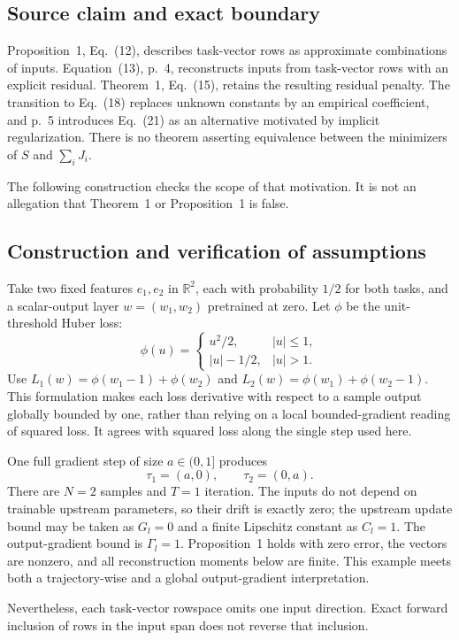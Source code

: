 \documentclass[10pt]{article}
\begin{document}
\subsection*{Source claim and exact boundary}
Proposition 1, Eq. (12), describes task-vector rows as approximate combinations of inputs. Equation (13), p. 4, reconstructs inputs from task-vector rows with an explicit residual. Theorem 1, Eq. (15), retains the resulting residual penalty. The transition to Eq. (18) replaces unknown constants by an empirical coefficient, and p. 5 introduces Eq. (21) as an alternative motivated by implicit regularization. There is no theorem asserting equivalence between the minimizers of \(S\) and \(\sum_iJ_i\).\par
The following construction checks the scope of that motivation. It is not an allegation that Theorem 1 or Proposition 1 is false.\par
\subsection*{Construction and verification of assumptions}
Take two fixed features \(e_1,e_2\) in \(\mathbb R^2\), each with probability \(1/2\) for both tasks, and a scalar-output layer \(w=(w_1,w_2)\) pretrained at zero. Let \(\phi\) be the unit-threshold Huber loss: \[\phi(u)=
 \begin{cases}u^2/2,&|u|\le1,\\ |u|-1/2,&|u|>1.\end{cases}\] Use \(L_1(w)=\phi(w_1-1)+\phi(w_2)\) and \(L_2(w)=\phi(w_1)+\phi(w_2-1)\). This formulation makes each loss derivative with respect to a sample output globally bounded by one, rather than relying on a local bounded-gradient reading of squared loss. It agrees with squared loss along the single step used here.\par
One full gradient step of size \(a\in(0,1]\) produces \[\tau_1=(a,0),\qquad \tau_2=(0,a).\] There are \(N=2\) samples and \(T=1\) iteration. The inputs do not depend on trainable upstream parameters, so their drift is exactly zero; the upstream update bound may be taken as \(G_l=0\) and a finite Lipschitz constant as \(C_l=1\). The output-gradient bound is \(\Gamma_l=1\). Proposition 1 holds with zero error, the vectors are nonzero, and all reconstruction moments below are finite. This example meets both a trajectory-wise and a global output-gradient interpretation.\par
Nevertheless, each task-vector rowspace omits one input direction. Exact forward inclusion of rows in the input span does not reverse that inclusion.\par
\end{document}
